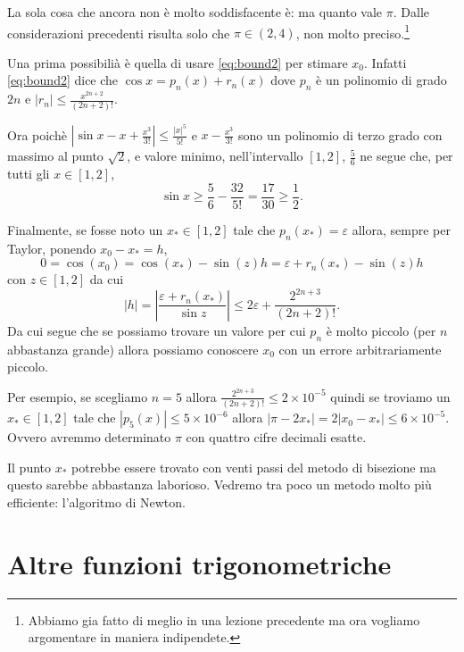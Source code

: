 \documentclass{amsart}
\numberwithin{equation}{section}
\newcommand\ve{\varepsilon}
\begin{document}
La sola cosa che ancora non \`e molto soddisfacente \`e: ma quanto vale $\pi$. Dalle considerazioni precedenti risulta solo che $\pi\in (2,4)$, non molto preciso.\footnote{Abbiamo gia fatto di meglio in una lezione precedente ma ora vogliamo argomentare in maniera indipendete.}

Una prima possibili\`a \`e quella di usare \eqref{eq:bound2} per stimare $x_0$. Infatti \eqref{eq:bound2} dice che $\cos x=p_n(x)+r_n(x)$ dove $p_n$ \`e un polinomio di grado $2n$ e $|r_n|\leq \frac{x^{2n+2}}{(2n+2)!}$. 

Ora poich\`e $|\sin x-x+\frac {x^3}{3!}|\leq \frac{|x|^5}{5!}$ e $x-\frac{x^3}{3!}$ sono un polinomio di terzo grado con massimo al punto $\sqrt 2$, e valore minimo, nell'intervallo $[1,2]$, $\frac 56$ ne segue che, per tutti gli $x\in [1,2]$,
\[
\sin x\geq \frac 56-\frac {32}{5!}=\frac {17}{30}\geq \frac 12.
\]

Finalmente, se fosse noto un $x_*\in[1,2]$ tale che $p_n(x_*)=\ve$ allora, sempre per Taylor,
ponendo $x_0-x_*=h$,
\[
0=\cos(x_0)=\cos(x_*)-\sin(z)h=\ve+r_n(x_*)-\sin(z)h
\]
con $z\in [1,2]$ da cui
\[
|h|=\left|\frac{\ve+r_n(x_*)}{\sin z}\right|\leq 2\ve+\frac{2^{2n+3}}{(2n+2)!}.
\]
Da cui segue che se possiamo trovare un valore per cui $p_n$ \`e molto piccolo (per $n$ abbastanza grande) allora possiamo conoscere $x_0$ con un errore arbitrariamente piccolo.

Per esempio, se scegliamo $n=5$ allora $\frac{2^{2n+3}}{(2n+2)!}\leq 2\times 10^{-5}$ quindi se troviamo un $x_*\in[1,2]$ tale che $|p_5(x)|\leq 5\times 10^{-6}$ allora $|\pi-2x_*|=2|x_0-x_*|\leq 6 \times 10^{-5}$. Ovvero avremmo determinato $\pi$ con quattro cifre decimali esatte.

Il punto $x_*$ potrebbe essere trovato con venti passi del metodo di bisezione ma questo sarebbe abbastanza laborioso. Vedremo tra poco un metodo molto pi\`u efficiente: l'algoritmo di Newton.

\section{Altre funzioni trigonometriche}
\end{document}
